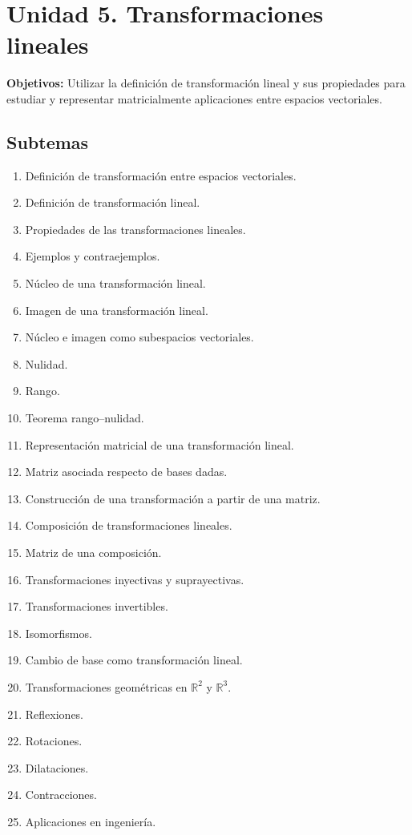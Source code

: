 \documentclass[12pt]{article}
\begin{document}
\section{Unidad 5. Transformaciones lineales}

\textbf{Objetivos:} Utilizar la definición de transformación lineal y sus propiedades para estudiar y representar matricialmente aplicaciones entre espacios vectoriales.

\subsection*{Subtemas}

\begin{enumerate}
    \item Definición de transformación entre espacios vectoriales.
    \item Definición de transformación lineal.
    \item Propiedades de las transformaciones lineales.
    \item Ejemplos y contraejemplos.
    \item Núcleo de una transformación lineal.
    \item Imagen de una transformación lineal.
    \item Núcleo e imagen como subespacios vectoriales.
    \item Nulidad.
    \item Rango.
    \item Teorema rango--nulidad.
    \item Representación matricial de una transformación lineal.
    \item Matriz asociada respecto de bases dadas.
    \item Construcción de una transformación a partir de una matriz.
    \item Composición de transformaciones lineales.
    \item Matriz de una composición.
    \item Transformaciones inyectivas y suprayectivas.
    \item Transformaciones invertibles.
    \item Isomorfismos.
    \item Cambio de base como transformación lineal.
    \item Transformaciones geométricas en $\mathbb{R}^2$ y $\mathbb{R}^3$.
    \item Reflexiones.
    \item Rotaciones.
    \item Dilataciones.
    \item Contracciones.
    \item Aplicaciones en ingeniería.
\end{enumerate}
\end{document}
